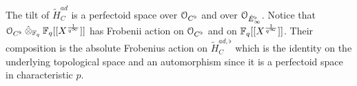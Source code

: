 The tilt of $\tilde{H}^{ad}_{C}$ is a perfectoid space over $\mathcal{O}_{C^{\flat}}$ and over $\mathcal{O}_{\hat{E}_{\infty}^{\flat}}$.
Notice that $\mathcal{O}_{C^{\flat}}\mathbin{\hat{\otimes}}_{\mathbb{F}_q}\mathbb{F}_q[[X^{\frac{1}{q^\infty}}]]$ has Frobenii action on $\mathcal{O}_{C^{\flat}}$ and on $\mathbb{F}_q[[X^{\frac{1}{q^\infty}}]]$. Their composition is the absolute Frobenius action on $\tilde{H}^{ad, \flat}_{C}$ which is the identity on the underlying topological space and an automorphism since it is a perfectoid space in characteristic $p$.






